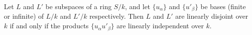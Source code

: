 Let $L$ and $L'$ be subspaces of a ring $S/k$, and let $\{u_\alpha\}$ and $\{u'_\beta\}$ be bases (finite or infinite) of $L/k$ and $L'/k$ respectively. Then $L$ and $L'$ are linearly disjoint over $k$ if and only if the products $\{u_\alpha u'_\beta\}$ are linearly independent over $k$.
